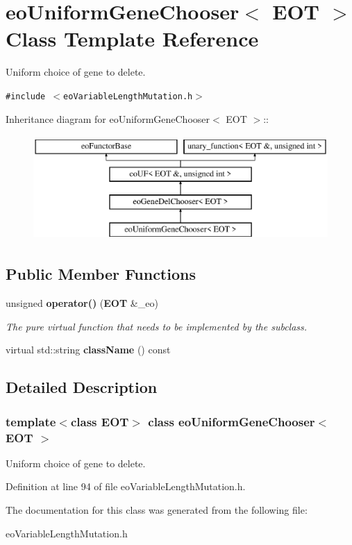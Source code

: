 \section{eo\-Uniform\-Gene\-Chooser$<$ EOT $>$ Class Template Reference}
\label{classeo_uniform_gene_chooser}
Uniform choice of gene to delete.  


{\tt \#include $<$eo\-Variable\-Length\-Mutation.h$>$}

Inheritance diagram for eo\-Uniform\-Gene\-Chooser$<$ EOT $>$::\begin{figure}[H]
\begin{center}
\leavevmode
\includegraphics[height=4cm]{classeo_uniform_gene_chooser}
\end{center}
\end{figure}
\subsection*{Public Member Functions}
\begin{CompactItemize}
\item 
unsigned {\bf operator()} ({\bf EOT} \&\_\-eo)\label{classeo_uniform_gene_chooser_a1}

\begin{CompactList}\small\item\em The pure virtual function that needs to be implemented by the subclass. \item\end{CompactList}\item 
virtual std::string {\bf class\-Name} () const \label{classeo_uniform_gene_chooser_a2}

\end{CompactItemize}


\subsection{Detailed Description}
\subsubsection*{template$<$class EOT$>$ class eo\-Uniform\-Gene\-Chooser$<$ EOT $>$}

Uniform choice of gene to delete. 



Definition at line 94 of file eo\-Variable\-Length\-Mutation.h.

The documentation for this class was generated from the following file:\begin{CompactItemize}
\item 
eo\-Variable\-Length\-Mutation.h\end{CompactItemize}

